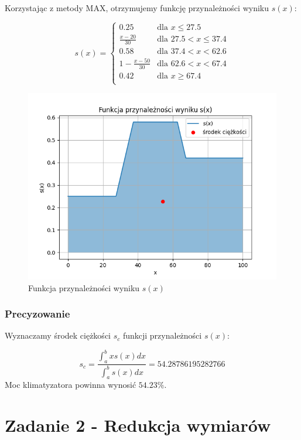 \documentclass{article}
\begin{document}
Korzystając z metody MAX, otrzymujemy funkcję przynależności
wyniku $s(x)$:

\begin{equation}
    s(x) = \begin{cases}
        0.25 & \text{dla } x \leq 27.5 \\
        \frac{x - 20}{30} & \text{dla } 27.5 < x \leq 37.4 \\
        0.58 & \text{dla } 37.4 < x < 62.6 \\
        1 - \frac{x - 50}{30} & \text{dla } 62.6 < x < 67.4 \\
        0.42 & \text{dla } x \geq 67.4 \\
    \end{cases}
\end{equation}

\begin{figure}[H]
    \centering
    \includegraphics[width=0.8\linewidth]{Zad1/composition.png}
    \caption{Funkcja przynależności wyniku $s(x)$}
\end{figure}

\subsubsection*{Precyzowanie}

Wyznaczamy środek ciężkości $s_c$ funkcji przynależności $s(x)$:

\begin{equation}
    s_c = \frac{\int_{a}^{b} x s(x) dx}{\int_{a}^{b} s(x) dx} = 54.28786195282766
\end{equation}
Moc klimatyzatora powinna wynosić $54.23 \%$.

\section{Zadanie 2 - Redukcja wymiarów}
\end{document}

